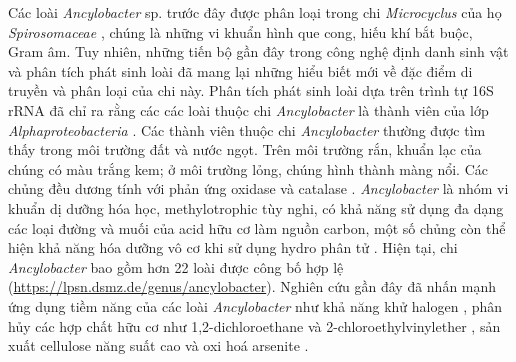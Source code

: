 \documentclass[journal]{IEEEtran}
\begin{document}
	Các loài \textit{Ancylobacter} sp. trước đây được phân loại trong chi \textit{Microcyclus} của họ \textit{Spirosomaceae} \cite{orskov1928beschreibung}, chúng là những vi khuẩn hình que cong, hiếu khí bắt buộc, Gram âm. Tuy nhiên, những tiến bộ gần đây trong công nghệ định danh sinh vật và phân tích phát sinh loài đã mang lại những hiểu biết mới về đặc điểm di truyền và phân loại của chi này. Phân tích phát sinh loài dựa trên trình tự 16S rRNA đã chỉ ra rằng các các loài thuộc chi \textit{Ancylobacter} là thành viên của lớp \textit{Alphaproteobacteria} \cite{woese1990phylogenetic}. Các thành viên thuộc chi \textit{Ancylobacter} thường được tìm thấy trong môi trường đất và nước ngọt. Trên môi trường rắn, khuẩn lạc của chúng có màu trắng kem; ở môi trường lỏng, chúng hình thành màng nổi. Các chủng đều dương tính với phản ứng oxidase và catalase \cite{larkin1977taxonomy}. \textit{Ancylobacter} là nhóm vi khuẩn dị dưỡng hóa học, methylotrophic tùy nghi, có khả năng sử dụng đa dạng các loại đường và muối của acid hữu cơ làm nguồn carbon, một số chủng còn thể hiện khả năng hóa dưỡng vô cơ khi sử dụng hydro phân tử \cite{namsaraev1978autotrophic}. Hiện tại, chi \textit{Ancylobacter} bao gồm hơn 22 loài được công bố hợp lệ (\href{(https://lpsn.dsmz.de/genus/ancylobacter}{https://lpsn.dsmz.de/genus/ancylobacter}). Nghiên cứu gần đây đã nhấn mạnh ứng dụng tiềm năng của các loài \textit{Ancylobacter} như khả năng khử halogen \cite{firsova2009ancylobacter}, phân hủy các hợp chất hữu cơ như 1,2-dichloroethane  \cite{wu2025characterization} và 2-chloroethylvinylether \cite{van1993degradation}, sản xuất cellulose năng suất cao \cite{martirani2025spontaneous} và oxi hoá arsenite \cite{andreoni2012arsenite,battaglia2002arsenic}.
	
\end{document}
